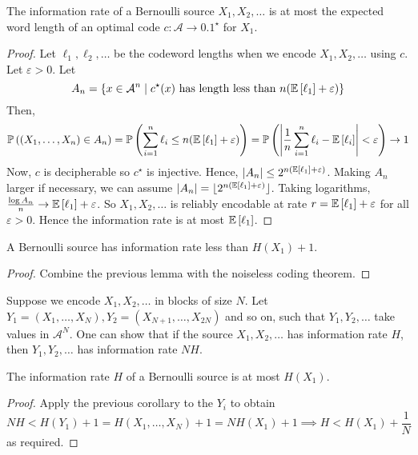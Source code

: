 \begin{lemma}
    The information rate of a Bernoulli source \( X_1, X_2, \dots \) is at most the expected word length of an optimal code \( c \colon \mathcal A \to \qty{0,1}^\star \) for \( X_1 \).
\end{lemma}
\begin{proof}
    Let \( \ell_1, \ell_2, \dots \) be the codeword lengths when we encode \( X_1, X_2, \dots \) using \( c \).
    Let \( \varepsilon > 0 \).
    Let
    \[ A_n = \qty{x \in \mathcal A^n \mid c^\star(x) \text{ has length less than } n \qty(\mathbb{E}\left[{\ell_1}\right] + \varepsilon)} \]
    Then,
    \[ \mathbb{P}\left({(X_1, \dots, X_n) \in A_n}\right) = \mathbb{P}\left({\sum_{i=1}^n \ell_i \leq n \qty(\mathbb{E}\left[{\ell_1}\right] + \varepsilon)}\right) = \mathbb{P}\left({\abs{\frac{1}{n} \sum_{i=1}^n \ell_i - \mathbb{E}\left[{\ell_i}\right]} < \varepsilon}\right) \to 1 \]
    Now, \( c \) is decipherable so \( c^\star \) is injective.
    Hence, \( \abs{A_n} \leq 2^{n\qty(\mathbb{E}\left[{\ell_1}\right] + \varepsilon)} \).
    Making \( A_n \) larger if necessary, we can assume \( \abs{A_n} = \lfloor2^{n\qty(\mathbb{E}\left[{\ell_1}\right] + \varepsilon)}\rfloor \).
    Taking logarithms, \( \frac{\log A_n}{n} \to \mathbb{E}\left[{\ell_1}\right] + \varepsilon \).
    So \( X_1, X_2, \dots \) is reliably encodable at rate \( r = \mathbb{E}\left[{\ell_1}\right] + \varepsilon \) for all \( \varepsilon > 0 \).
    Hence the information rate is at most \( \mathbb{E}\left[{\ell_1}\right] \).
\end{proof}
\begin{corollary}
    A Bernoulli source has information rate less than \( H(X_1) + 1 \).
\end{corollary}
\begin{proof}
    Combine the previous lemma with the noiseless coding theorem.
\end{proof}
Suppose we encode \( X_1, X_2, \dots \) in blocks of size \( N \).
Let \( Y_1 = (X_1, \dots, X_N), Y_2 = (X_{N+1}, \dots, X_{2N}) \) and so on, such that \( Y_1, Y_2, \dots \) take values in \( \mathcal A^N \).
One can show that if the source \( X_1, X_2, \dots \) has information rate \( H \), then \( Y_1, Y_2, \dots \) has information rate \( NH \).
\begin{proposition}
    The information rate \( H \) of a Bernoulli source is at most \( H(X_1) \).
\end{proposition}
\begin{proof}
    Apply the previous corollary to the \( Y_i \) to obtain
    \[ NH < H(Y_1) + 1 = H(X_1, \dots, X_N) + 1 = NH(X_1) + 1 \implies H < H(X_1) + \frac{1}{N} \]
    as required.
\end{proof}

